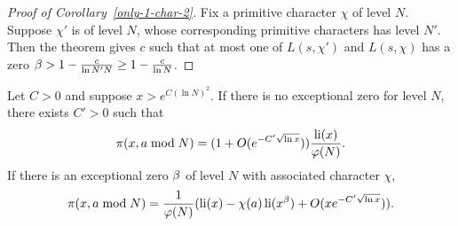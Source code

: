 \begin{proof}[Proof of Corollary~\ref{only-1-char-2}]
Fix a primitive character $\chi$ of level $N$.
Suppose $\chi'$ is of level $N$, whose corresponding primitive characters has level $N'$. Then the theorem gives $c$ such that at most one of $L(s,\chi')$ and $L(s,\chi)$ has a zero $\beta>1-\frac{c}{\ln N'N}\ge 1-\frac{c}{\ln N}$.
\end{proof}
\begin{thm}
Let $C>0$ and suppose $x>e^{C(\ln N)^2}$. If there is no exceptional zero for level $N$, there exists $C'>0$ such that  
\[
\pi(x,a\bmod N)=(1+O(e^{-C'\sqrt{\ln x}}))\frac{\operatorname{li}(x)}{\varphi(N)}.
\]
If there is an exceptional zero $\beta$ of level $N$ with associated character $\chi$,
\[
\pi(x,a\bmod N)=\frac{1}{\varphi(N)}(\operatorname{li}(x)-\chi(a)\operatorname{li}(x^{\beta})+O(xe^{-C'\sqrt{\ln x}})).
\]
\end{thm}
